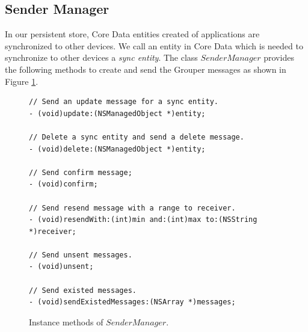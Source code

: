 \documentclass[a4paper,11pt]{report}
\begin{document}
\subsection{Sender Manager} \label{subsection:sender_manager}

In our persistent store, Core Data entities created of applications are synchronized to other devices.
We call an entity in Core Data which is needed to synchronize to other devices a \emph{sync entity}.
The class $SenderManager$ provides the following methods to create and send the Grouper messages as shown in Figure \ref{fig:sender_manager}.

\begin{figure}
\begin{lstlisting}[frame=none language=Objective-C] 
// Send an update message for a sync entity.
- (void)update:(NSManagedObject *)entity;

// Delete a sync entity and send a delete message.
- (void)delete:(NSManagedObject *)entity;

// Send confirm message;
- (void)confirm;

// Send resend message with a range to receiver.
- (void)resendWith:(int)min and:(int)max to:(NSString *)receiver;

// Send unsent messages.
- (void)unsent;

// Send existed messages.
- (void)sendExistedMessages:(NSArray *)messages;	
\end{lstlisting}
\caption{Instance methods of $SenderManager$.}
\label{fig:sender_manager}
\end{figure}
\end{document}
